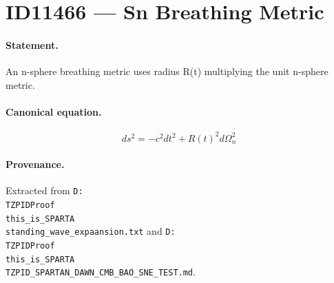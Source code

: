 \section*{ID11466 --- Sn Breathing Metric}

\paragraph{Statement.}
An n-sphere breathing metric uses radius R(t) multiplying the unit n-sphere metric.

\paragraph{Canonical equation.}
\[
ds^2=-c^2dt^2+R(t)^2d\Omega_n^2
\]

\paragraph{Provenance.}
Extracted from \texttt{D:\\TZPIDProof\\this\_is\_SPARTA\\standing\_wave\_expaansion.txt} and \texttt{D:\\TZPIDProof\\this\_is\_SPARTA\\TZPID\_SPARTAN\_DAWN\_CMB\_BAO\_SNE\_TEST.md}.
